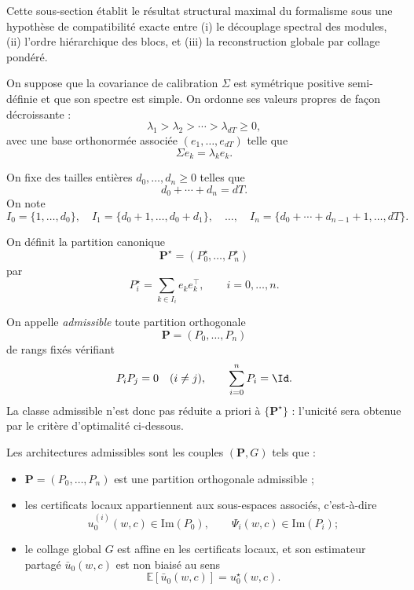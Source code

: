 Cette sous-section établit le résultat structural maximal du formalisme sous une hypothèse de compatibilité exacte entre
(i) le découplage spectral des modules,
(ii) l'ordre hiérarchique des blocs, et
(iii) la reconstruction globale par collage pondéré.

\begin{assumption}
On suppose que la covariance de calibration \(\Sigma\) est symétrique positive semi-définie
et que son spectre est simple.
On ordonne ses valeurs propres de façon décroissante :
\[
\lambda_1>\lambda_2>\cdots>\lambda_{dT}\ge 0,
\]
avec une base orthonormée associée \((e_1,\dots,e_{dT})\) telle que
\[
\Sigma e_k=\lambda_k e_k.
\]

On fixe des tailles entières \(d_0,\dots,d_n\ge 0\) telles que
\[
d_0+\cdots+d_n=dT.
\]
On note
\[
I_0=\{1,\dots,d_0\},\quad
I_1=\{d_0+1,\dots,d_0+d_1\},\quad \dots,\quad
I_n=\{d_0+\cdots+d_{n-1}+1,\dots,dT\}.
\]

On définit la partition canonique
\[
\mathbf P^\star=(P_0^\star,\dots,P_n^\star)
\]
par
\[
P_i^\star=\sum_{k\in I_i} e_ke^\top_k,
\qquad i=0,\dots,n.
\]

On appelle \emph{admissible} toute partition orthogonale
\[
\mathbf P=(P_0,\dots,P_n)
\]
de rangs fixés vérifiant
\[
P_iP_j=0\quad(i\neq j),
\qquad
\sum_{i=0}^n P_i=\Id.
\]
La classe admissible n'est donc pas réduite a priori à \(\{\mathbf P^\star\}\) :
l'unicité sera obtenue par le critère d'optimalité ci-dessous.
\end{assumption}

\begin{assumption}
Les architectures admissibles sont les couples \((\mathbf P,G)\) tels que :

\begin{itemize}[leftmargin=2em]
    \item \(\mathbf P=(P_0,\dots,P_n)\) est une partition orthogonale admissible ;
    \item les certificats locaux appartiennent aux sous-espaces associés, c'est-à-dire
    \[
    u_0^{(i)}(w,c)\in \mathrm{Im}(P_0),
    \qquad
    \Psi_i(w,c)\in \mathrm{Im}(P_i);
    \]
    \item le collage global \(G\) est affine en les certificats locaux, et son estimateur partagé
    \(\bar u_0(w,c)\) est non biaisé au sens
    \[
    \mathbb E[\bar u_0(w,c)]=u_0^\star(w,c).
    \]
\end{itemize}
\end{assumption}

